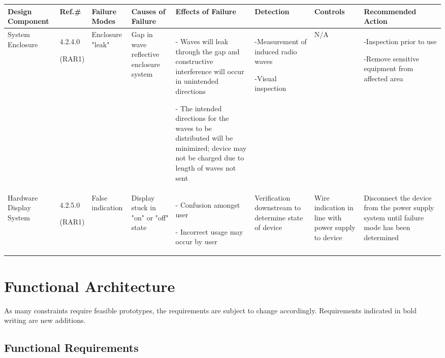 \documentclass[12pt, titlepage]{article}
\begin{document}
\begin{center}
\begin{adjustwidth}{-3.5cm}{}
\begin{tabular}{|p{1.6cm}|p{1.2cm}|p{1.6cm}|p{2.0cm}|p{3.7cm}|p{2cm}|p{2cm}|p{3.5cm}|}
\hline
Design Component & Ref.\# & Failure Modes & Causes of Failure & Effects of Failure & Detection & Controls & Recommended Action\\
\hline
System Enclosure & 4.2.4.0 \par (RAR1) & Enclosure "leak" & Gap in wave reflective enclosure system & - Waves will leak through the gap and constructive interference will occur in unintended directions \par - The intended directions for the waves to be distributed will be minimized; device may not be charged due to length of waves not sent  & -Measurement of induced radio waves \par -Visual inspection & N/A & -Inspection prior to use \par -Remove sensitive equipment from affected area\\
\hline
Hardware Display System & 4.2.5.0 \par (RAR1) & False indication & Display stuck in "on" or "off" state & - Confusion amongst user \par - Incorrect usage may occur by user & Verification downstream to determine state of device & Wire indication in line with power supply to device & Disconnect the device from the power supply system until failure mode has been determined\\
\hline
\end{tabular}
\end{adjustwidth}
\end{center}

\fancyhf{}
\fancyhead[C]{\thepage}
\renewcommand{\headrulewidth}{0pt}
\pagestyle{plain}

\section{Functional Architecture}
As many constraints require feasible prototypes, the requirements are subject to change accordingly. Requirements indicated in bold writing are new additions.
\subsection{Functional Requirements}
\end{document}
